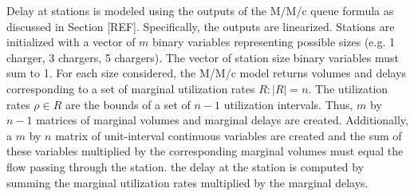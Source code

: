 \documentclass[12pt]{article}
\begin{document}
Delay at stations is modeled using the outputs of the M/M/c queue formula as discussed in Section [REF]. Specifically, the outputs are linearized. Stations are initialized with a vector of $m$ binary variables representing possible sizes (e.g. 1 charger, 3 chargers, 5 chargers). The vector of station size binary variables must sum to 1. For each size considered, the M/M/c model returns volumes and delays corresponding to a set of marginal utilization rates $R: |R| = n$. The utilization rates $\rho \in R$ are the bounds of a set of $n - 1$ utilization intervals. Thus, $m$ by $n - 1$ matrices of marginal volumes and marginal delays are created. Additionally, a $m$ by $n$ matrix of unit-interval continuous variables are created and the sum of these variables multiplied by the corresponding marginal volumes must equal the flow passing through the station. the delay at the station is computed by summing the marginal utilization rates multiplied by the marginal delays.
\end{document}
